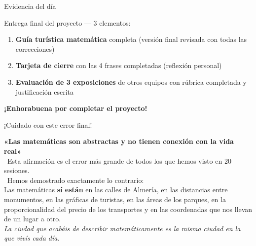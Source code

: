 \documentclass[aspectratio=169, 10pt, spanish]{beamer}
\begin{document}
\begin{frame}{Evidencia del día}
  \begin{evidenciabox}
    Entrega final del proyecto — 3 elementos:
    \begin{enumerate}
      \item \textbf{Guía turística matemática} completa
            (versión final revisada con todas las correcciones)
      \item \textbf{Tarjeta de cierre} con las 4 frases completadas
            (reflexión personal)
      \item \textbf{Evaluación de 3 exposiciones} de otros equipos
            con rúbrica completada y justificación escrita
    \end{enumerate}
    \vspace{6pt}
    \begin{center}
      \AlmFontLarge\color{AlmAmbar}
      {\AlmFontLargeUp\faAward}\quad
      \textbf{¡Enhorabuena por completar el proyecto!}
    \end{center}
  \end{evidenciabox}
\end{frame}

\begin{frame}{¡Cuidado con este error final!}
  \begin{errorbox}
    \textbf{«Las matemáticas son abstractas y no tienen
    conexión con la vida real»}\\[8pt]
    \incorrecto\ Esta afirmación es el error más grande
    de todos los que hemos visto en 20 sesiones.\\[8pt]
    \correcto\ Hemos demostrado exactamente lo contrario:\\
    Las matemáticas \textbf{sí están} en las calles de Almería,
    en las distancias entre monumentos, en las gráficas
    de turistas, en las áreas de los parques, en la
    proporcionalidad del precio de los transportes y en
    las coordenadas que nos llevan de un lugar a otro.\\[6pt]
    \textit{La ciudad que acabáis de describir matemáticamente
    es la misma ciudad en la que vivís cada día.}
  \end{errorbox}
\end{frame}
\end{document}
